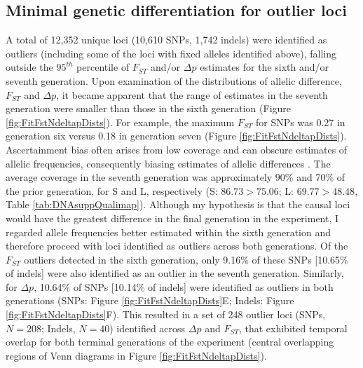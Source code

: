 \subsection{Minimal genetic differentiation for outlier loci}
A total of 12,352 unique loci (10,610 SNPs, 1,742 indels) were identified as outliers (including some of the loci with fixed alleles identified above), falling outside the $95^{th}$ percentile of $F_{ST}$ and/or $\Delta p$ estimates for the sixth and/or seventh generation. Upon examination of the distributions of allelic difference, $F_{ST}$ and $\Delta p$, it became apparent that the range of estimates in the seventh generation were smaller than those in the sixth generation (Figure \ref{fig:FitFstNdeltapDists}). For example, the maximum $F_{ST}$ for SNPs was 0.27 in generation six versus 0.18 in generation seven (Figure \ref{fig:FitFstNdeltapDists}). Ascertainment bias often arises from low coverage and can obscure estimates of allelic frequencies, consequently biasing estimates of allelic differences \citep{Schl15, Hahn18, Wals18}. The average coverage in the seventh generation was approximately 90\% and 70\% of the prior generation, for S and L, respectively (S: $86.73 > 75.06$; L: $69.77 > 48.48$, Table \ref{tab:DNAsuppQualimap}). Although my hypothesis is that the causal loci would have the greatest difference in the final generation in the experiment, I regarded allele frequencies better estimated within the sixth generation and therefore proceed with loci identified as outliers across both generations. Of the $F_{ST}$ outliers detected in the sixth generation, only 9.16\% of these SNPs [10.65\% of indels] were also identified as an outlier in the seventh generation. Similarly, for $\Delta p$, 10.64\% of SNPs [10.14\% of indels] were identified as outliers in both generations (SNPs: Figure \ref{fig:FitFstNdeltapDists}E; Indels: Figure \ref{fig:FitFstNdeltapDists}F). This resulted in a set of 248 outlier loci (SNPs, $N = 208$; Indels, $N = 40$) identified across $\Delta p$ and $F_{ST}$, that exhibited temporal overlap for both terminal generations of the experiment (central overlapping regions of Venn diagrams in Figure \ref{fig:FitFstNdeltapDists}).\par

